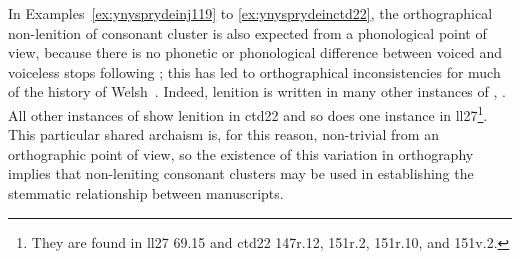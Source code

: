 In Examples~\ref{ex:ynysprydeinj119} to \ref{ex:ynysprydeinctd22}, the orthographical non-lenition of  consonant cluster  is also expected from a phonological point of view, because there is no phonetic or phonological difference between voiced and voiceless stops following ; this has led to orthographical inconsistencies for much of the history of Welsh~\autocite[§~111.vi]{Mor_Welsh13}.
Indeed, lenition is written in many other instances of , \ie {}. All other instances of   show lenition in \gls{ctd22} and so does one instance in \gls{ll27}\footnote{They are found in \gls{ll27} 69.15 and \gls{ctd22} 147r.12, 151r.2, 151r.10, and 151v.2.}. This particular shared archaism is, for this reason, non-trivial from an orthographic point of view, so the existence of this variation in orthography implies that non-leniting consonant clusters may be used in establishing the stemmatic relationship between  manuscripts. 
\begin{mwl}
\end{mwl}

